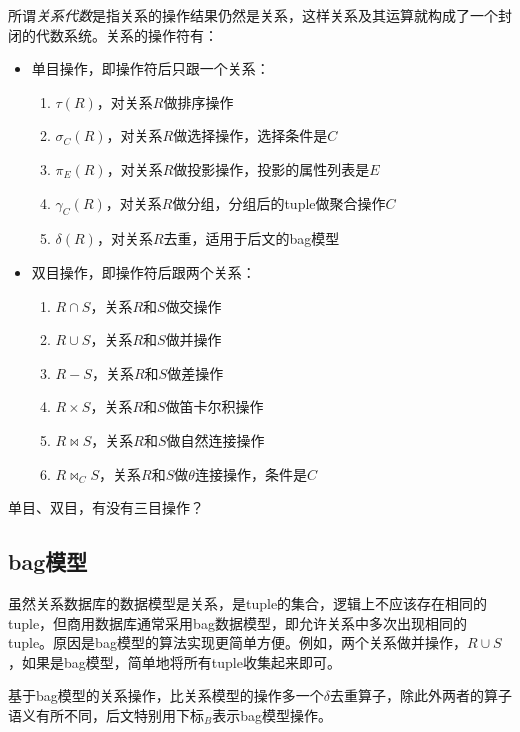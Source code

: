 所谓\emph{关系代数}是指关系的操作结果仍然是关系，这样关系及其运算就构成了一个封闭的代数系统。关系的操作符有：
\begin{itemize}
    \item 单目操作，即操作符后只跟一个关系：
          \begin{enumerate}
              \item $\tau(R)$，对关系$R$做排序操作
              \item $\sigma_C(R)$，对关系$R$做选择操作，选择条件是$C$
              \item $\pi_E(R)$，对关系$R$做投影操作，投影的属性列表是$E$
              \item $\gamma_C(R)$，对关系$R$做分组，分组后的tuple做聚合操作$C$
              \item $\delta(R)$，对关系$R$去重，适用于后文的bag模型
          \end{enumerate}

    \item 双目操作，即操作符后跟两个关系：
          \begin{enumerate}
              \item $R \cap S$，关系$R$和$S$做交操作
              \item $R \cup S$，关系$R$和$S$做并操作
              \item $R - S$，关系$R$和$S$做差操作
              \item $R \times S$，关系$R$和$S$做笛卡尔积操作
              \item $R \bowtie S$，关系$R$和$S$做自然连接操作
              \item $R \bowtie_C S$，关系$R$和$S$做$\theta$连接操作，条件是$C$
          \end{enumerate}
\end{itemize}

\begin{exercise}
    单目、双目，有没有三目操作？
\end{exercise}

\subsection{bag模型}

虽然关系数据库的数据模型是关系，是tuple的集合，逻辑上不应该存在相同的tuple，但商用数据库通常采用bag数据模型，即允许关系中多次出现相同的tuple。原因是bag模型的算法实现更简单方便。例如，两个关系做并操作，$R \cup S$，如果是bag模型，简单地将所有tuple收集起来即可。

基于bag模型的关系操作，比关系模型的操作多一个$\delta$去重算子，除此外两者的算子语义有所不同，后文特别用下标$_B$表示bag模型操作。

